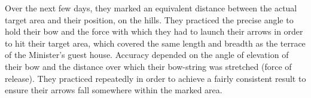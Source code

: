 Over the next few days, they marked an equivalent distance between the actual
target area and their position, on the hills. They practiced the precise angle
to hold their bow and the force with which they had to launch their arrows in
order to hit their target area, which covered the same length and breadth as the
terrace of the Minister's guest house. Accuracy depended on the angle of
elevation of their bow and the distance over which their bow-string was
stretched (force of release). They practiced repeatedly in order to achieve a
fairly consistent result to ensure their arrows fall somewhere within the marked
area.